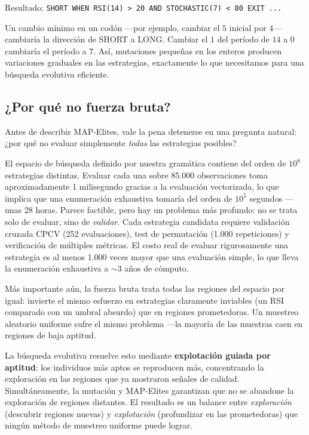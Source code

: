 \documentclass[12pt,a4paper]{article}
\begin{document}
Resultado: \texttt{SHORT WHEN RSI(14) > 20 AND STOCHASTIC(7) < 80 EXIT ...}

Un cambio mínimo en un codón ---por ejemplo, cambiar el $5$ inicial por $4$---
cambiaría la dirección de SHORT a LONG. Cambiar el $1$ del período de $14$ a $0$
cambiaría el período a $7$. Así, mutaciones pequeñas en los enteros producen
variaciones graduales en las estrategias, exactamente lo que necesitamos para una
búsqueda evolutiva eficiente.

\subsection{¿Por qué no fuerza bruta?}
\label{sec:whynot}

Antes de describir MAP-Elites, vale la pena detenerse en una pregunta natural:
¿por qué no evaluar simplemente \textit{todas} las estrategias posibles?

El espacio de búsqueda definido por nuestra gramática contiene del orden de $10^8$
estrategias distintas. Evaluar cada una sobre 85.000 observaciones toma
aproximadamente 1 milisegundo gracias a la evaluación vectorizada, lo que implica
que una enumeración exhaustiva tomaría del orden de $10^5$ segundos ---unas 28 horas.
Parece factible, pero hay un problema más profundo: no se trata solo de evaluar,
sino de \textit{validar}. Cada estrategia candidata requiere validación cruzada
CPCV (252 evaluaciones), test de permutación (1.000 repeticiones) y verificación de
múltiples métricas. El costo real de evaluar rigurosamente una estrategia es al
menos 1.000 veces mayor que una evaluación simple, lo que lleva la enumeración
exhaustiva a $\sim$3 años de cómputo.

Más importante aún, la fuerza bruta trata todas las regiones del espacio por
igual: invierte el mismo esfuerzo en estrategias claramente inviables (un RSI
comparado con un umbral absurdo) que en regiones prometedoras. Un muestreo
aleatorio uniforme sufre el mismo problema ---la mayoría de las muestras caen en
regiones de baja aptitud.

La búsqueda evolutiva resuelve esto mediante \textbf{explotación guiada por
aptitud}: los individuos más aptos se reproducen más, concentrando la exploración
en las regiones que ya mostraron señales de calidad. Simultáneamente, la mutación
y MAP-Elites garantizan que no se abandone la exploración de regiones distantes.
El resultado es un balance entre \textit{exploración} (descubrir regiones nuevas)
y \textit{explotación} (profundizar en las prometedoras) que ningún método de
muestreo uniforme puede lograr.
\end{document}
